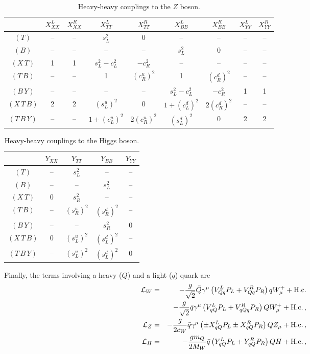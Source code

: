 \documentclass[12pt,a4paper]{article}
\newcommand{\gm}{\gamma^\mu}
\newcommand{\Wm}{W_{\mu}}
\newcommand{\Zm}{Z_{\mu}}
\newcommand{\ts}{$(T)$}
\newcommand{\bs}{$(B)$}
\newcommand{\xt}{$(X\,T)$}
\newcommand{\tb}{$(T\,B)$}
\newcommand{\by}{$(B\,Y)$}
\newcommand{\xtb}{$(X\,T\,B)$}
\newcommand{\tby}{$(T\,B\,Y)$}
\newcommand{\slx}{s_L}
\newcommand{\slu}{s_L^u}
\newcommand{\sld}{s_L^d}
\newcommand{\clx}{c_L}
\newcommand{\clu}{c_L^u}
\newcommand{\cld}{c_L^d}
\newcommand{\srx}{s_R}
\newcommand{\sru}{s_R^u}
\newcommand{\srd}{s_R^d}
\newcommand{\crx}{c_R}
\newcommand{\cru}{c_R^u}
\newcommand{\crd}{c_R^d}
\begin{document}
\begin{table}[htb]
\begin{center}
\begin{tabular}{c|cccccccc}
& $X_{XX}^L$ & $X_{XX}^R$ & $X_{TT}^L$ & $X_{TT}^R$ & $X_{BB}^L$ & $X_{BB}^R$ & $X_{YY}^L$ & $X_{YY}^R$
\\ \hline
\ts & -- & -- & $\slx^2$ & 0 & -- & -- & -- & --
\\
\bs & -- & -- & -- & -- & $\slx^2$ & 0 & -- & --
\\
\xt & 1 & 1 & $\slx^2 - \clx^2$ & $-\crx^2$ & -- & -- & -- & --
\\
\tb & -- & -- & 1 & $(\cru)^2$ & 1 & $(\crd)^2$ & -- & --
\\
\by & -- & -- & -- & -- & $\slx^2 - \clx^2$ & $-\crx^2$ & 1 & 1
\\
\xtb & 2 & 2 & $(\slu)^2$ & 0 & $1+(\cld)^2$ & $2 (\crd)^2$ & -- & --
\\
\tby & -- & -- & $1+(\clu)^2$ & $2 (\cru)^2$ & $(\sld)^2$ & 0 & 2 & 2
%
\end{tabular}
\caption{Heavy-heavy couplings to the $Z$ boson.}
\label{tab:hhZ}
\end{center}
\end{table}


\begin{table}[htb]
\begin{center}
\begin{tabular}{c|cccc}
& $Y_{XX}$ & $Y_{TT}$ & $Y_{BB}$ & $Y_{YY}$ 
\\ \hline
\ts & -- & $\slx^2$ & -- & --
\\
\bs & -- & -- & $\slx^2$ & --
\\
\xt & 0 & $\srx^2$ & -- & --
\\
\tb & -- & $(\sru)^2$ & $(\srd)^2$ & --
\\
\by & -- & -- & $\srx^2$ & 0
\\
\xtb & 0 & $(\slu)^2$ & $(\sld)^2$ & --
\\
\tby & -- & $(\slu)^2$ & $(\sld)^2$ & 0
%
\end{tabular}
\caption{Heavy-heavy couplings to the Higgs boson.}
\label{tab:hhH}
\end{center}
\end{table}




Finally, the terms involving a heavy ($Q$) and a light ($q$) quark are
\begin{eqnarray}
\mathcal{L}_W & = & -\frac{g}{\sqrt 2} \bar Q \gm \left( V_{Qq}^L P_L + V_{Qq}^R P_R \right) q \Wm^+ +\text{H.c.} \notag \\
& & -\frac{g}{\sqrt 2} \bar q \gm \left( V_{qQ}^L P_L + V_{qQq}^R P_R \right) Q \Wm^+ +\text{H.c.} \,, \notag \\ 
%
\mathcal{L}_Z & = & -\frac{g}{2 c_W} \bar q \gm \left( \pm X_{qQ}^L P_L \pm X_{qQ}^R P_R \right) Q \Zm +\text{H.c.} \,, \notag \\
%
\mathcal{L}_H & = & -\frac{g m_Q}{2M_W} \bar q \left( Y_{qQ}^L P_L +  Y_{qQ}^R P_R \right) Q H +\text{H.c.} \,,
\end{eqnarray}
\end{document}

